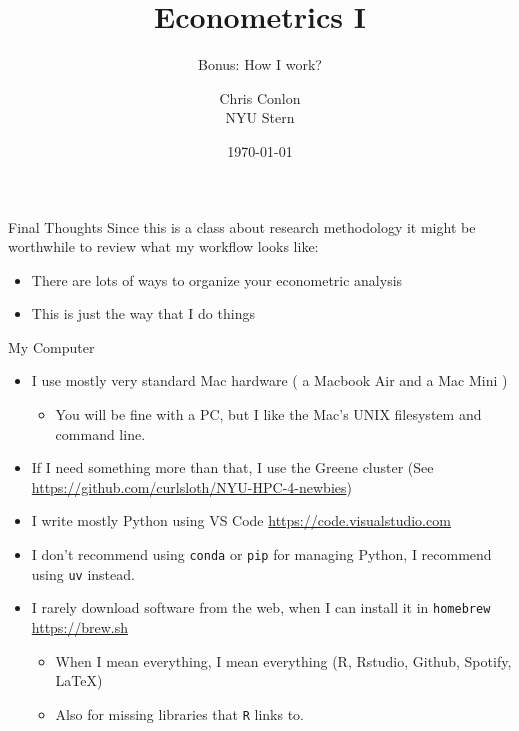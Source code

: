 \documentclass[aspectratio=169,11pt]{beamer}
\begin{document}
\title[Econometrics I]{ Econometrics I}
\subtitle{Bonus: How I work?}
\author{Chris Conlon \\NYU Stern}
\date{\today}
\maketitle

\begin{frame}{Final Thoughts}
Since this is a class about \alert{research methodology} it might be worthwhile to review what my workflow looks like:

\begin{itemize}
	\item There are lots of ways to organize your econometric analysis
	\item This is just the way that I do things
\end{itemize}
\end{frame}


\begin{frame}{My Computer}
\begin{itemize}
	\item I use mostly very standard Mac hardware ( a Macbook Air and a Mac Mini )
	\begin{itemize}
		\item You will be fine with a PC, but I like the Mac's UNIX filesystem and command line.
	\end{itemize}
	\item If I need something more than that, I use the Greene cluster (See \url{https://github.com/curlsloth/NYU-HPC-4-newbies})
	\item I write mostly Python using VS Code \url{https://code.visualstudio.com}
	\item I don't recommend using \texttt{conda} or \texttt{pip} for managing Python, I recommend using \texttt{uv} instead.
	\item I rarely download software from the web, when I can install it in \texttt{homebrew} \url{https://brew.sh}
	\begin{itemize}
		\item When I mean everything, I mean everything (R, Rstudio, Github, Spotify, LaTeX)
		\item Also for missing libraries that \texttt{R} links to.
	\end{itemize}
\end{itemize}
\end{frame}
\end{document}
